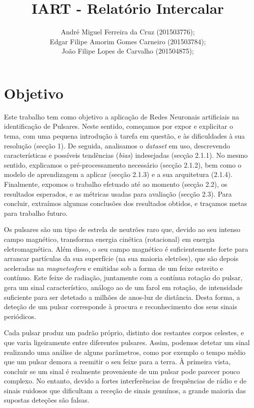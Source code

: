 \documentclass[]{article}
\title{IART - Relatório Intercalar}
\author{
	André Miguel Ferreira da Cruz (201503776);\\
    Edgar Filipe Amorim Gomes Carneiro (201503784);\\
	João Filipe Lopes de Carvalho (201504875);\\
}
\begin{document}
\setlength{\textwidth}{18cm}
\setlength{\textheight}{22cm}



\newpage


\tableofcontents
\newpage


\section{Objetivo}
	Este trabalho tem como objetivo a aplicação de Redes Neuronais artificiais na identificação de Pulsares. Neste sentido, começamos por expor e explicitar o tema, com uma pequena introdução à tarefa em questão, e às dificuldades à sua resolução (secção 1). De seguida, analisamos o \textit{dataset} em uso, descrevendo características e possíveis tendências (\textit{bias}) indesejadas (secção 2.1.1). No mesmo sentido, explicamos o pré-processamento necessário (secção 2.1.2), bem como o modelo de aprendizagem a aplicar (secção 2.1.3) e a sua arquitetura (2.1.4). Finalmente, expomos o trabalho efetuado até ao momento (secção 2.2), os resultados esperados, e as métricas usadas para avaliação (secção 2.3). Para concluir, extraímos algumas conclusões dos resultados obtidos, e traçamos metas para trabalho futuro.
	
    Os pulsares são um tipo de estrela de neutrões raro que, devido ao seu intenso campo magnético, transforma energia cinética (rotacional) em energia eletromagnética. Além disso, o seu campo magnético é suficientemente forte para arrancar partículas da sua superfície (na sua maioria eletrões), que são depois aceleradas na \textit{magnetosfera} e emitidas sob a forma de um feixe estreito e contínuo. Este feixe de radiação, juntamente com a contínua rotação do pulsar, gera um sinal característico, análogo ao de um farol em rotação, de intensidade suficiente para ser detetado a milhões de anos-luz de distância. Desta forma, a deteção de um pulsar corresponde à procura e reconhecimento dos seus sinais periódicos.
    
    Cada pulsar produz um padrão próprio, distinto dos restantes corpos celestes, e que varia ligeiramente entre diferentes pulsares. Assim, podemos detetar um sinal realizando uma análise de alguns parâmetros, como por exemplo o tempo médio que um pulsar demora a reemitir o seu feixe para a terra. À primeira vista, concluir se um sinal é realmente proveniente de um pulsar pode parecer pouco complexo. No entanto, devido a fortes interferências de frequências de rádio e de sinais ruidosos que dificultam a receção de sinais genuínos, a grande maioria das supostas deteções são falsas.
    
\end{document}
